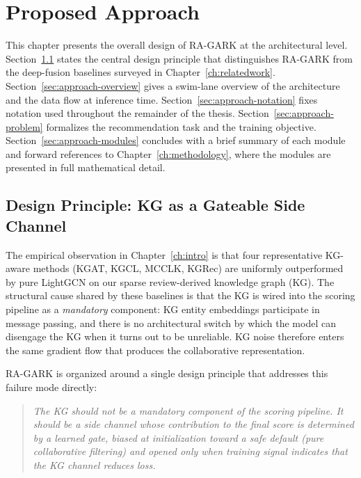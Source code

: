 \chapter{Proposed Approach}
\label{ch:architecture}

This chapter presents the overall design of RA-GARK at the architectural level. Section~\ref{sec:approach-principle} states the central design principle that distinguishes RA-GARK from the deep-fusion baselines surveyed in Chapter~\ref{ch:relatedwork}. Section~\ref{sec:approach-overview} gives a swim-lane overview of the architecture and the data flow at inference time. Section~\ref{sec:approach-notation} fixes notation used throughout the remainder of the thesis. Section~\ref{sec:approach-problem} formalizes the recommendation task and the training objective. Section~\ref{sec:approach-modules} concludes with a brief summary of each module and forward references to Chapter~\ref{ch:methodology}, where the modules are presented in full mathematical detail.

\section{Design Principle: KG as a Gateable Side Channel}
\label{sec:approach-principle}

The empirical observation in Chapter~\ref{ch:intro} is that four representative KG-aware methods (KGAT, KGCL, MCCLK, KGRec) are uniformly outperformed by pure LightGCN on our sparse review-derived knowledge graph (KG). The structural cause shared by these baselines is that the KG is wired into the scoring pipeline as a \emph{mandatory} component: KG entity embeddings participate in message passing, and there is no architectural switch by which the model can disengage the KG when it turns out to be unreliable. KG noise therefore enters the same gradient flow that produces the collaborative representation.

RA-GARK is organized around a single design principle that addresses this failure mode directly:

\begin{quote}
\emph{The KG should not be a mandatory component of the scoring pipeline. It should be a side channel whose contribution to the final score is determined by a learned gate, biased at initialization toward a safe default (pure collaborative filtering) and opened only when training signal indicates that the KG channel reduces loss.}
\end{quote}

